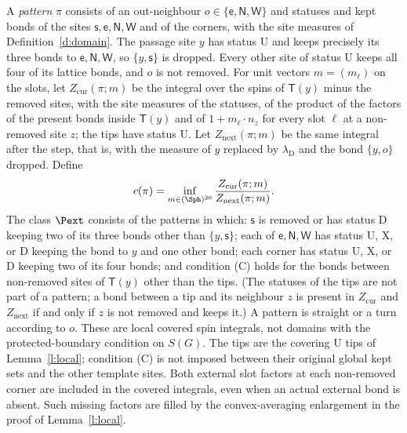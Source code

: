 \begin{definition}\label{d:pattern}
A \emph{pattern} $\pi$ consists of an out-neighbour
$o\in\{\mathsf e,\mathsf N,\mathsf W\}$ and statuses and kept bonds
of the sites $\mathsf s,\mathsf e,\mathsf N,\mathsf W$ and of the
corners, with the site measures of Definition~\ref{d:domain}. The
passage site $y$ has status $\mathrm U$ and keeps precisely its three
bonds to $\mathsf e,\mathsf N,\mathsf W$, so $\{y,\mathsf s\}$ is
dropped. Every other site of status $\mathrm U$ keeps all four of
its lattice bonds, and $o$ is not removed. For unit vectors
$m=(m_\ell)$ on the slots, let $Z_{\mathrm{cur}}(\pi;m)$ be the
integral over the spins of $\mathsf T(y)$ minus the removed sites,
with the site measures of the statuses, of the product of the factors
of the present bonds inside $\mathsf T(y)$ and of
$1+m_\ell\cdot n_z$ for every slot $\ell$ at a non-removed site $z$;
the tips have status $\mathrm U$. Let
$Z_{\mathrm{next}}(\pi;m)$ be the same integral after the step,
that is, with the measure of $y$ replaced by $\lambda_{\mathrm D}$
and the bond $\{y,o\}$ dropped. Define
\begin{equation}\label{e:cpi}
c(\pi) = \inf_{m \in (\Sph)^{20}} \frac{Z_{\mathrm{cur}}(\pi; m)}{Z_{\mathrm{next}}(\pi; m)} .
\end{equation}
The class $\Pext$ consists of the patterns in which: $\mathsf s$ is removed or has status $\mathrm D$ keeping two of its three bonds other than $\{y, \mathsf s\}$; each of $\mathsf e, \mathsf N, \mathsf W$ has status $\mathrm U$, $\mathrm X$, or $\mathrm D$ keeping the bond to $y$ and one other bond; each corner has status $\mathrm U$, $\mathrm X$, or $\mathrm D$ keeping two of its four bonds; and condition (C) holds for the bonds between non-removed sites of $\mathsf T(y)$ other than the tips. (The statuses of the tips are not part of a pattern; a bond between a tip and its neighbour $z$ is present in $Z_{\mathrm{cur}}$ and $Z_{\mathrm{next}}$ if and only if $z$ is not removed and keeps it.) A pattern is straight or a turn according to $o$.
These are local covered spin integrals, not domains with the
protected-boundary condition on $S(G)$. The tips are the covering
$\mathrm U$ tips of Lemma~\ref{l:local}; condition (C) is not imposed
between their original global kept sets and the other template sites.
Both external slot factors at each non-removed corner are included in
the covered integrals, even when an actual external bond is absent.
Such missing factors are filled by the convex-averaging enlargement
in the proof of Lemma~\ref{l:local}.
\end{definition}

